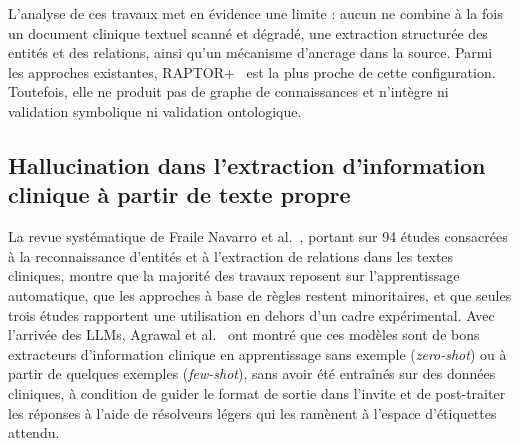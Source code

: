 L'analyse de ces travaux met en évidence une limite : aucun ne combine à la fois un document clinique textuel scanné et dégradé, une extraction structurée des entités et des relations, ainsi qu'un mécanisme d'ancrage dans la source. Parmi les approches existantes, RAPTOR+~\cite{raptorplus2026} est la plus proche de cette configuration. Toutefois, elle ne produit pas de graphe de connaissances et n'intègre ni validation symbolique ni validation ontologique.

\subsection{Hallucination dans l'extraction d'information clinique à partir de texte propre}

La revue systématique de Fraile Navarro et al.~\cite{fraile2023review}, portant sur 94 études consacrées à la reconnaissance d'entités et à l'extraction de relations dans les textes cliniques, montre que la majorité des travaux reposent sur l'apprentissage automatique, que les approches à base de règles restent minoritaires, et que seules trois études rapportent une utilisation en dehors d'un cadre expérimental. Avec l'arrivée des LLMs, Agrawal et al.~\cite{agrawal2022fewshot} ont montré que ces modèles sont de bons extracteurs d'information clinique en apprentissage sans exemple (\textit{zero-shot}) ou à partir de quelques exemples (\textit{few-shot}), sans avoir été entraînés sur des données cliniques, à condition de guider le format de sortie dans l'invite et de post-traiter les réponses à l'aide de résolveurs légers qui les ramènent à l'espace d'étiquettes attendu.

